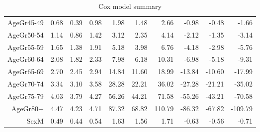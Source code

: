 \begin{table}[ht]
\begin{tabular}{rrrrrrrrrr}
  AgeGr45-49 & 0.68 & 0.39 & 0.98 & 1.98 & 1.48 & 2.66 & -0.98 & -0.48 & -1.66 \\ 
  AgeGr50-54 & 1.14 & 0.86 & 1.42 & 3.12 & 2.35 & 4.14 & -2.12 & -1.35 & -3.14 \\ 
  AgeGr55-59 & 1.65 & 1.38 & 1.91 & 5.18 & 3.98 & 6.76 & -4.18 & -2.98 & -5.76 \\ 
  AgeGr60-64 & 2.08 & 1.82 & 2.33 & 7.98 & 6.18 & 10.31 & -6.98 & -5.18 & -9.31 \\ 
  AgeGr65-69 & 2.70 & 2.45 & 2.94 & 14.84 & 11.60 & 18.99 & -13.84 & -10.60 & -17.99 \\ 
  AgeGr70-74 & 3.34 & 3.10 & 3.58 & 28.28 & 22.21 & 36.02 & -27.28 & -21.21 & -35.02 \\ 
  AgeGr75-79 & 4.03 & 3.79 & 4.27 & 56.26 & 44.21 & 71.58 & -55.26 & -43.21 & -70.58 \\ 
  AgeGr80+ & 4.47 & 4.23 & 4.71 & 87.32 & 68.82 & 110.79 & -86.32 & -67.82 & -109.79 \\ 
  SexM & 0.49 & 0.44 & 0.54 & 1.63 & 1.56 & 1.71 & -0.63 & -0.56 & -0.71 \\ 
   \hline
\end{tabular}
\caption{Cox model summary} 
\end{table}
